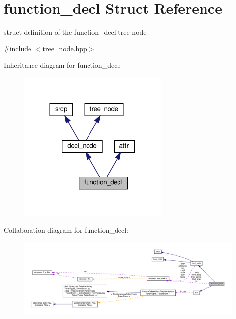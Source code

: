 \hypertarget{structfunction__decl}{}\section{function\+\_\+decl Struct Reference}
\label{structfunction__decl}


struct definition of the \hyperlink{structfunction__decl}{function\+\_\+decl} tree node.  




{\ttfamily \#include $<$tree\+\_\+node.\+hpp$>$}



Inheritance diagram for function\+\_\+decl\+:
\nopagebreak
\begin{figure}[H]
\begin{center}
\leavevmode
\includegraphics[width=209pt]{db/da3/structfunction__decl__inherit__graph}
\end{center}
\end{figure}


Collaboration diagram for function\+\_\+decl\+:
\nopagebreak
\begin{figure}[H]
\begin{center}
\leavevmode
\includegraphics[width=350pt]{d0/d38/structfunction__decl__coll__graph}
\end{center}
\end{figure}
